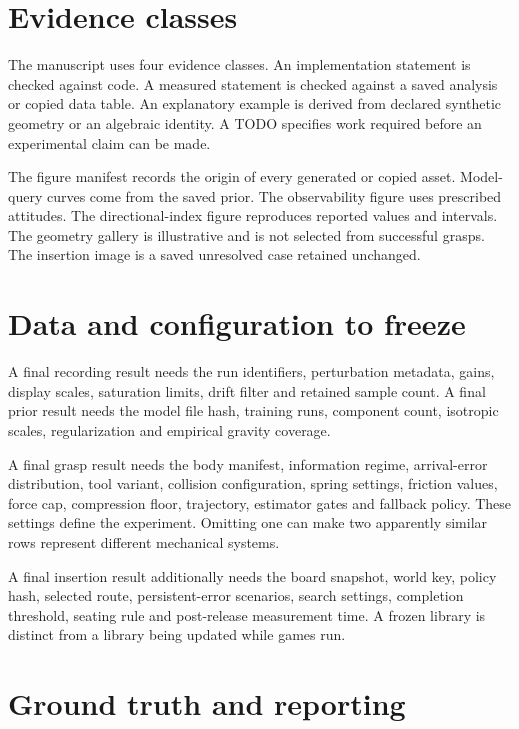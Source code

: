 \section{Evidence classes}

The manuscript uses four evidence classes. An implementation statement is checked against code. A measured statement is checked against a saved analysis or copied data table. An explanatory example is derived from declared synthetic geometry or an algebraic identity. A TODO specifies work required before an experimental claim can be made.

The figure manifest records the origin of every generated or copied asset. Model-query curves come from the saved prior. The observability figure uses prescribed attitudes. The directional-index figure reproduces reported values and intervals. The geometry gallery is illustrative and is not selected from successful grasps. The insertion image is a saved unresolved case retained unchanged.

\section{Data and configuration to freeze}

A final recording result needs the run identifiers, perturbation metadata, gains, display scales, saturation limits, drift filter and retained sample count. A final prior result needs the model file hash, training runs, component count, isotropic scales, regularization and empirical gravity coverage.

A final grasp result needs the body manifest, information regime, arrival-error distribution, tool variant, collision configuration, spring settings, friction values, force cap, compression floor, trajectory, estimator gates and fallback policy. These settings define the experiment. Omitting one can make two apparently similar rows represent different mechanical systems.

A final insertion result additionally needs the board snapshot, world key, policy hash, selected route, persistent-error scenarios, search settings, completion threshold, seating rule and post-release measurement time. A frozen library is distinct from a library being updated while games run.

\section{Ground truth and reporting}


